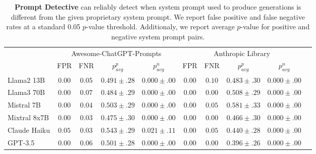 \begin{table*}
  \caption{{\bf Prompt Detective} can reliably detect when system prompt used to produce generations is different from the given proprietary system prompt. We report false positive and false negative rates at a standard 0.05 $p$-value threshold. Additionaly, we report average $p$-value for positive  and negative system prompt pairs. }
  \label{tab: standard-setup-results}
  \centering
  \setlength{\tabcolsep}{5pt}
  \begin{tabular}{lccccccccc}
    \toprule
    & \multicolumn{4}{c}{Awesome-ChatGPT-Prompts} & \multicolumn{4}{c}{Anthropic Library} \\
    \cmidrule(lr){2-9}
    
  & FPR & FNR & $p^p_{avg}$ & $p^n_{avg}$ & FPR & FNR & $p^p_{avg}$ & $p^n_{avg}$ & \\
    \midrule
    
Llama2 13B & $0.00$ & $0.05$ & $0.491 \scriptscriptstyle \pm \scriptstyle .28$ & $0.000 \scriptscriptstyle \pm \scriptstyle .00$ & $0.00$ & $0.10$ & $0.483 \scriptscriptstyle \pm \scriptstyle .30$ & $0.000 \scriptscriptstyle \pm \scriptstyle .00$ \\
Llama3 70B & $0.00$ & $0.07$ & $0.484 \scriptscriptstyle \pm \scriptstyle .29$ & $0.000 \scriptscriptstyle \pm \scriptstyle .00$ & $0.00$ & $0.00$ & $0.508 \scriptscriptstyle \pm \scriptstyle .29$ & $0.000 \scriptscriptstyle \pm \scriptstyle .00$ \\
Mistral 7B & $0.00$ & $0.04$ & $0.503 \scriptscriptstyle \pm \scriptstyle .29$ & $0.000 \scriptscriptstyle \pm \scriptstyle .00$ & $0.00$ & $0.05$ & $0.581 \scriptscriptstyle \pm \scriptstyle .33$ & $0.000 \scriptscriptstyle \pm \scriptstyle .00$ \\
Mixtral 8x7B & $0.00$ & $0.03$ & $0.475 \scriptscriptstyle \pm \scriptstyle .30$ & $0.000 \scriptscriptstyle \pm \scriptstyle .00$ & $0.00$ & $0.00$ & $0.466 \scriptscriptstyle \pm \scriptstyle .30$ & $0.000 \scriptscriptstyle \pm \scriptstyle .00$ \\
Claude Haiku & $0.05$ & $0.03$ & $0.543 \scriptscriptstyle \pm \scriptstyle .29$ & $0.021 \scriptscriptstyle \pm \scriptstyle .11$ & $0.00$ & $0.05$ & $0.440 \scriptscriptstyle \pm \scriptstyle .28$ & $0.000 \scriptscriptstyle \pm \scriptstyle .00$ \\
GPT-3.5 & $0.00$ & $0.06$ & $0.501 \scriptscriptstyle \pm \scriptstyle .28$ & $0.000 \scriptscriptstyle \pm \scriptstyle .00$ & $0.00$ & $0.00$ & $0.396 \scriptscriptstyle \pm \scriptstyle .26$ & $0.000 \scriptscriptstyle \pm \scriptstyle .00$ \\
\bottomrule
\end{tabular}
\end{table*}